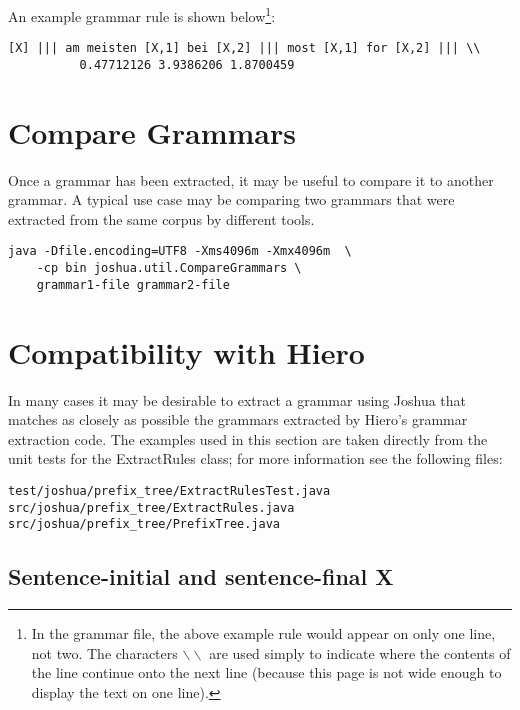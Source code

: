 An example grammar rule is shown below\footnote{In the grammar file, the above example rule would appear on only one line, not two. The characters $\backslash\backslash$ are used simply to indicate where the contents of the line continue onto the next line (because this page is not wide enough to display the text on one line).}:

\begin{verbatim}
[X] ||| am meisten [X,1] bei [X,2] ||| most [X,1] for [X,2] ||| \\
          0.47712126 3.9386206 1.8700459
\end{verbatim}






\section{Compare Grammars}

Once a grammar has been extracted, it may be useful to compare it to another grammar. A typical use case may be comparing two grammars that were extracted from the same corpus by different tools.

\begin{verbatim}
java -Dfile.encoding=UTF8 -Xms4096m -Xmx4096m  \
    -cp bin joshua.util.CompareGrammars \
    grammar1-file grammar2-file
\end{verbatim}


\section{Compatibility with Hiero}

In many cases it may be desirable to extract a grammar using Joshua that matches as closely as possible the grammars extracted by Hiero's grammar extraction code. The examples used in this section are taken directly from the unit tests for the ExtractRules class; for more information see the following files:

\begin{verbatim}
test/joshua/prefix_tree/ExtractRulesTest.java
src/joshua/prefix_tree/ExtractRules.java
src/joshua/prefix_tree/PrefixTree.java
\end{verbatim}


\subsection{Sentence-initial and sentence-final X}

